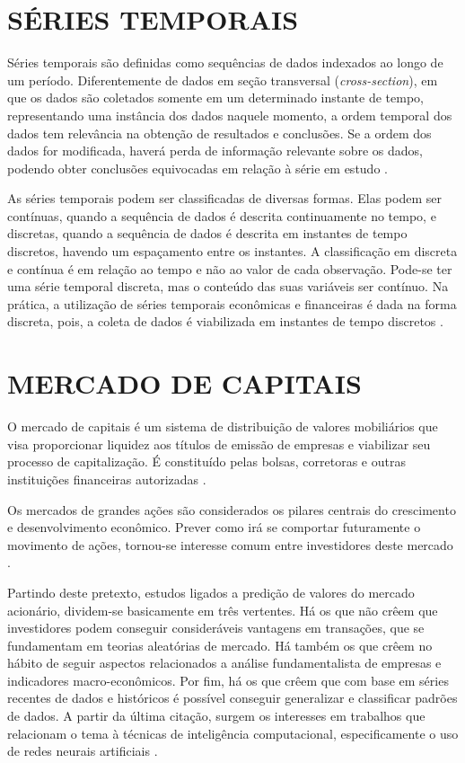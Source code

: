 \section{SÉRIES TEMPORAIS}\label{series-temporais}
Séries temporais são definidas como sequências de dados indexados ao longo de um período. Diferentemente de dados em seção transversal (\textit{cross-section}), em que os dados são coletados somente em um determinado instante de tempo, representando uma instância dos dados naquele momento, a ordem temporal dos dados tem relevância na obtenção de resultados e conclusões. Se a ordem dos dados for modificada, haverá perda de informação relevante sobre os dados, podendo obter conclusões equivocadas em relação à série em estudo \cite{neto}.

As séries temporais podem ser classificadas de diversas formas. Elas podem ser contínuas, quando a sequência de dados é descrita continuamente no tempo, e discretas, quando a sequência de dados é descrita em instantes de tempo discretos, havendo um espaçamento entre os instantes. A classificação em discreta e contínua é em relação ao tempo e não ao valor de cada observação. Pode-se ter uma série temporal discreta, mas o conteúdo das suas variáveis ser contínuo. Na prática, a utilização de séries temporais econômicas e financeiras é dada na forma discreta, pois, a coleta de dados é viabilizada em instantes de tempo discretos \cite{oliveira2012}.

\section{MERCADO DE CAPITAIS}\label{capitais}
O mercado de capitais é um sistema de distribuição de valores mobiliários que visa proporcionar liquidez aos títulos de emissão de empresas e viabilizar seu processo de capitalização. É constituído pelas bolsas, corretoras e outras instituições financeiras autorizadas \cite{tororadar}.

Os mercados de grandes ações são considerados os pilares centrais do crescimento e desenvolvimento econômico. Prever como irá se comportar futuramente o movimento de ações, tornou-se interesse comum entre investidores deste mercado \cite{pereira}.

Partindo deste pretexto, estudos ligados a predição de valores do mercado acionário, dividem-se basicamente em três vertentes. Há os que não crêem que investidores podem conseguir consideráveis vantagens em transações, que se fundamentam em teorias aleatórias de mercado. Há também os que crêem no hábito de seguir aspectos relacionados a análise fundamentalista de empresas e indicadores macro-econômicos. Por fim, há os que crêem que com base em séries recentes de dados e históricos é possível conseguir generalizar e classificar padrões de dados. A partir da última citação, surgem os interesses em trabalhos que relacionam o tema à técnicas de inteligência computacional, especificamente o uso de redes neurais artificiais \cite{pereira}.

